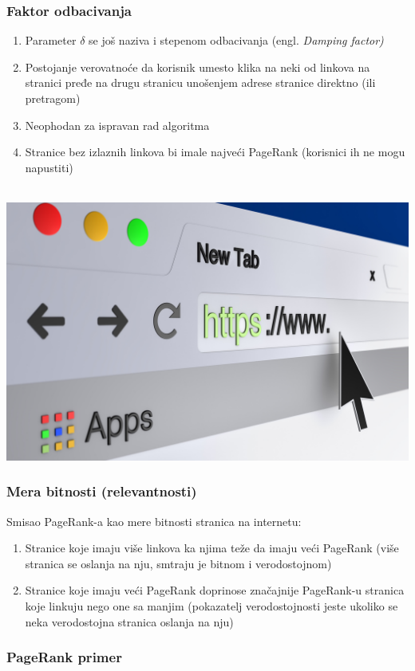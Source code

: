 \documentclass[11pt]{beamer}
\begin{document}
\begin{frame}
    \frametitle{Faktor odbacivanja}
  		\begin{center}
            \begin{enumerate}
                \item Parameter $\delta$ se još naziva i stepenom odbacivanja (engl. \textit{Damping factor)}
                \item Postojanje verovatnoće da korisnik umesto klika na neki od linkova na stranici pređe na drugu stranicu unošenjem adrese stranice direktno (ili pretragom)
                \item Neophodan za ispravan rad algoritma
                \item Stranice bez izlaznih linkova bi imale najveći PageRank (korisnici ih ne mogu napustiti)
            \end{enumerate}
            \leavevmode \\
            \includegraphics[width=0.4\columnwidth]{url.jpg}
        \end{center}
\end{frame}

\begin{frame}
    \frametitle{Mera bitnosti (relevantnosti)}
    Smisao PageRank-a kao mere bitnosti stranica na internetu:
  		\begin{center}
            \begin{enumerate}
                \item Stranice koje imaju više linkova ka njima teže da imaju veći PageRank (više stranica se oslanja na nju, smtraju je bitnom i verodostojnom)
                \item Stranice koje imaju veći PageRank doprinose značajnije PageRank-u stranica koje linkuju nego one sa manjim (pokazatelj verodostojnosti jeste ukoliko se neka verodostojna stranica oslanja na nju)
            \end{enumerate}
        \end{center}
\end{frame}

\begin{frame}
    \frametitle{PageRank primer}
  		\begin{center}
\begin{figure}[h]
\centering{
\resizebox{100mm}{!}{}
}
\end{figure}
        \end{center}
\end{frame}
\end{document}
